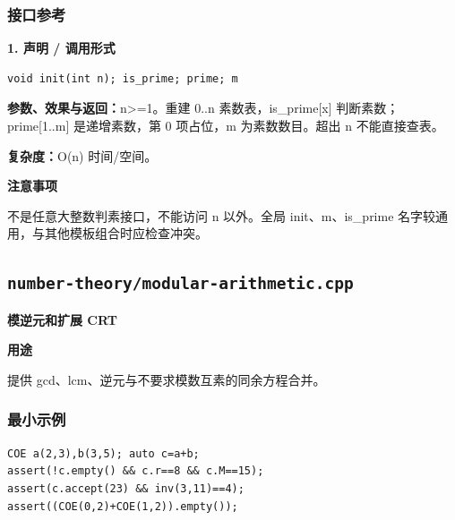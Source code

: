 \documentclass[UTF8,a4paper,10pt]{ctexart}
\newcommand{\TemplUsage}[1]{\textbf{用途}\par #1\par}
\newcommand{\TemplNote}[1]{\textbf{注意事项}\par #1\par}
\begin{document}
\subsubsection*{接口参考}
\noindent\begin{minipage}{\textwidth}
\textbf{1. 声明 / 调用形式}
\begin{lstlisting}
void init(int n); is_prime; prime; m
\end{lstlisting}
\textbf{参数、效果与返回：}n>=1。重建 0..n 素数表，is\_prime[x] 判断素数；prime[1..m] 是递增素数，第 0 项占位，m 为素数数目。超出 n 不能直接查表。

\textbf{复杂度：}O(n) 时间/空间。

\TemplNote{不是任意大整数判素接口，不能访问 n 以外。全局 init、m、is\_prime 名字较通用，与其他模板组合时应检查冲突。}
\end{minipage}\par\vspace{0.4em}
\clearpage
\subsection{\texttt{number-theory/modular-arithmetic.cpp}}
\textbf{模逆元和扩展 CRT}\par
\TemplUsage{提供 gcd、lcm、逆元与不要求模数互素的同余方程合并。}
\subsubsection*{最小示例}
\begin{lstlisting}
COE a(2,3),b(3,5); auto c=a+b;
assert(!c.empty() && c.r==8 && c.M==15);
assert(c.accept(23) && inv(3,11)==4);
assert((COE(0,2)+COE(1,2)).empty());
\end{lstlisting}
\end{document}
